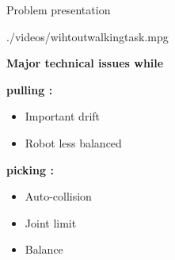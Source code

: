 \begin{frame}{Problem presentation}
  \vspace*{0.6cm}
  \begin{center}
    {./videos/wihtoutwalkingtask.mpg}
  \end{center}
  \textbf{\color{blue} Major technical issues while }\\
  \begin{minipage}{0.45\textwidth}
    \textbf{\color{blue} pulling :}
    \begin{itemize}
      \item Important drift
      \item Robot less balanced
    \end{itemize}
    \vspace*{0.4cm}    
  \end{minipage}
  \begin{minipage}{0.45\textwidth}
    \textbf{\color{blue} picking :}
    \begin{itemize}
      \item Auto-collision
      \item Joint limit
      \item Balance
    \end{itemize}
  \end{minipage}
\end{frame}
